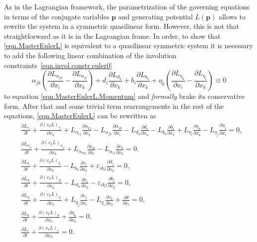 \documentclass[twoside]{article}
\newcommand{\pp}{{\boldsymbol{p}}}
\newcommand{\pd}{\partial}
\begin{document}
As in the Lagrangian framework, the parametrization of the governing equations 
in terms of the conjugate variables $ \pp $ and generating potential $ L(\pp) $ 
allows 
to rewrite the system in a symmetric quasilinear form. However, this is not 
that straightforward as it is in the Lagrangian frame. In order, to show that 
\eqref{eqn.MasterEulerL} is equivalent to a quasilinear symmetric system it is 
necessary to add the following linear combination of the involution 
constraints~\eqref{eqn.invol.constr.euler0}
\begin{equation}\label{eqn.symm.combin0}
\alpha_{jk}\left(\frac{\pd L_{\alpha_{jk}}}{\pd x_i}-\frac{\pd 
L_{\alpha_{ji}}}{\pd x_k}\right) + d_i \frac{\pd L_{d_k}}{\pd x_k} + b_i 
\frac{\pd L_{b_k}}{\pd x_k} + \eta_k\left(\frac{\pd L_{\eta_{k}}}{\pd 
x_i}-\frac{\pd 
L_{\eta_{i}}}{\pd x_k}\right) \equiv 0
\end{equation}
to equation \eqref{eqn.MasterEulerL.Momentum} and \textit{formally} brake its 
conservative form. After that and some trivial term 
rearrangements in the rest of the equations, \eqref{eqn.MasterEulerL} can be 
rewritten as
\begin{subequations}\label{eqn.MasterEulerL.symmetric}
	\begin{align}
	& \displaystyle\frac{\pd L_{v_i}}{\pd t} + \frac{\pd(v_k 
	L)_{v_i}}{\pd x_k} + L_{\alpha_{ij}}\frac{\pd \alpha_{kj}}{\pd x_k} - 
		L_{\alpha_{jk}}\frac{\pd \alpha_{jk}}{\pd x_i}- L_{d_k}\frac{\pd 
		d_i}{\pd 
		x_k} - L_{b_k}\frac{\pd 
	b_i}{\pd x_k} + L_{\eta_i}\frac{\pd \eta_k}{\pd x_k} - 
	L_{\eta_j}\frac{\pd \eta_j}{\pd x_i}= 0, 
	\label{eqn.MasterEulerL.symmetric.a}\\[2mm]
	& \displaystyle\frac{\pd L_{\alpha_{ij}}}{\pd t} + \frac{\pd  (v_k 
	L)_{\alpha_{ij}}}{\pd x_k} + L_{\alpha_{mj}}\frac{\pd v_m}{\pd x_i} - 
	L_{\alpha_{ij}}\frac{\pd v_k}{\pd x_k} = 0, \\[2mm]
	& \displaystyle\frac{\pd L_{b_{i}}}{\pd t}+\frac{\pd 
	(v_kL)_{b_i}}{\pd x_k} - L_{b_k}\frac{\pd v_i}{\pd x_k} + 
		\varepsilon_{ikj}\frac{\pd d_j}{\pd x_k}= 0,\\[2mm]
	& \displaystyle\frac{\pd L_{d_{i}}}{\pd t}+\frac{\pd 
	(v_kL)_{d_i}}{\pd x_k} - L_{d_k}\frac{\pd v_i}{\pd x_k} - 
	\varepsilon_{ikj}\frac{\pd b_j}{\pd x_k}= 0,\\[2mm]
	& \displaystyle\frac{\pd L_{\eta_i}}{\pd t} + \frac{\pd 
	(v_k L)_{\eta_i}}{\pd x_k} + L_{\eta_j}\frac{\pd v_j}{\pd x_i} - 
	L_{\eta_i}\frac{\pd v_k}{\pd x_k} + \frac{\pd \theta}{\pd x_i}= 0, 
	\label{eqn.MasterEulerL.symmetric.f}\\[2mm]
	& \displaystyle\frac{\pd L_{\theta}}{\pd t}+\frac{\pd 
	(v_k L)_\theta}{\pd x_k} + \frac{\pd \eta_k}{\pd x_k}=0, 
	\label{eqn.MasterEulerL.symmetric.e}\\[2mm]
	& \displaystyle\frac{\pd L_r}{\pd t} + \frac{\pd  (v_k 
	L)_r}{\pd x_k} = 0.
	\end{align}
\end{subequations}
\end{document}
